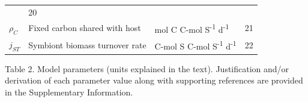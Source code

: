 \documentclass[]{elsarticle} %
\begin{document}
\begin{longtable}[]{@{}llll@{}}
\begin{minipage}[t]{0.26\columnwidth}
\end{minipage} & \begin{minipage}[t]{0.09\columnwidth}\raggedright\strut
20\strut
\end{minipage}\tabularnewline
\begin{minipage}[t]{0.09\columnwidth}\raggedright\strut
\(\rho_C\)\strut
\end{minipage} & \begin{minipage}[t]{0.44\columnwidth}\raggedright\strut
Fixed carbon shared with host\strut
\end{minipage} & \begin{minipage}[t]{0.26\columnwidth}\raggedright\strut
mol C C-mol S\textsuperscript{-1} d\textsuperscript{-1}\strut
\end{minipage} & \begin{minipage}[t]{0.09\columnwidth}\raggedright\strut
21\strut
\end{minipage}\tabularnewline
\begin{minipage}[t]{0.09\columnwidth}\raggedright\strut
\(j_{ST}\)\strut
\end{minipage} & \begin{minipage}[t]{0.44\columnwidth}\raggedright\strut
Symbiont biomass turnover rate\strut
\end{minipage} & \begin{minipage}[t]{0.26\columnwidth}\raggedright\strut
C-mol S C-mol S\textsuperscript{-1} d\textsuperscript{-1}\strut
\end{minipage} & \begin{minipage}[t]{0.09\columnwidth}\raggedright\strut
22\strut
\end{minipage}\tabularnewline
\bottomrule
\end{longtable}

Table 2. Model parameters (units explained in the text). Justification
and/or derivation of each parameter value along with supporting
references are provided in the Supplementary Information.
\end{document}

